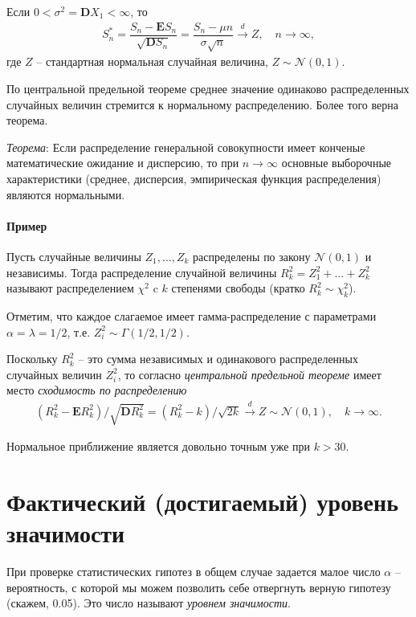 \documentclass[%
	11pt,
	a4paper,
	utf8,
		]{article}
\begin{document}
Если $ 0 < \sigma^2 = \mathbf{D}X_1 < \infty $, то
\begin{align*}
	S^{*}_n = \dfrac{ S_n - \mathbf{E}S_n }{ \sqrt{\mathbf{D} S_n} } = \dfrac{S_n - \mu n}{\sigma \sqrt{n}} \xrightarrow{d} Z, \quad n \to \infty,
\end{align*}
где $ Z $ -- стандартная нормальная случайная величина, $ Z \sim \mathcal{N}(0, 1) $.

По центральной предельной теореме среднее значение одинаково распределенных случайных величин стремится к нормальному распределению. Более того верна теорема.

\emph{Теорема}: Если распределение генеральной совокупности имеет конченые математические ожидание и дисперсию, то при $ n \to \infty $ основные выборочные характеристики (среднее, дисперсия, эмпирическая функция распределения) являются нормальными.

\paragraph{Пример} Пусть случайные величины $ Z_1, \dots, Z_k $ распределены по закону $ \mathcal{N}(0, 1) $ и независимы. Тогда распределение случайной величины $ R^2_k = Z_1^2 + \dots + Z_k^2 $ называют распределением $ \chi^2 $ c $ k $ степенями свободы (кратко $ R_k^2 \sim \chi_k^2 $).

Отметим, что каждое слагаемое имеет гамма-распределение с параметрами $ \alpha = \lambda = 1/2 $, т.е. $ Z_i^2 \sim \Gamma(1/2, 1/2) $. 

Поскольку $ R_k^2 $ -- это сумма независимых и одинакового распределенных случайных величин $ Z_i^2 $, то согласно \emph{центральной предельной теореме} имеет место \emph{сходимость по распределению}
\begin{align*}
	(R_k^2 - \mathbf{E}R_k^2) / \sqrt{\mathbf{D}R_k^2} = (R_k^2 - k)/\sqrt{2 k} \xrightarrow{d} Z \sim \mathcal{N}(0, 1), \quad k \to \infty.
\end{align*}

Нормальное приближение является довольно точным уже при $ k > 30 $.


\section{Фактический (достигаемый) уровень значимости}

При проверке статистических гипотез в общем случае задается малое число $ \alpha $ -- вероятность, с которой мы можем позволить себе отвергнуть верную гипотезу (скажем, 0.05). Это число называют \emph{уровнем значимости}.
\end{document}
